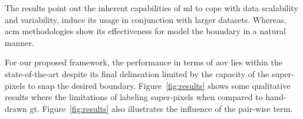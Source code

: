The results point out the inherent capabilities of \ac{ml} to cope with data scalability and variability, induce its usage in conjunction with larger datasets.
Whereas, \ac{acm} methodologies show its effectiveness for model the boundary in a natural manner.

For our proposed framework, the performance in terms of \ac{aov} lies within the state-of-the-art despite its final delineation 
limited by the capacity of the super-pixels to snap the desired boundary.
Figure~\ref{fig:results} shows some qualitative results where the limitations of labeling super-pixels when compared to hand-drawn \ac{gt}.
Figure~\ref{fig:results} also illustrates the influence of the pair-wise term.








